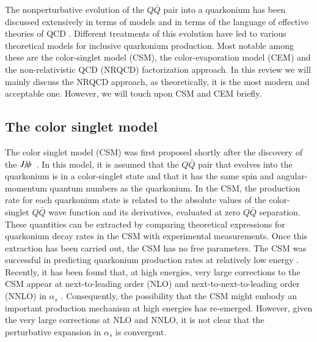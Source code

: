 The nonperturbative evolution of the $Q\bar Q$ pair into a quarkonium
has been discussed extensively in terms of models and in terms of the
language of effective theories of QCD
\cite{Bodwin:1994jh,Brambilla:2004wf}. Different
treatments of this evolution have led to various theoretical models for
inclusive quarkonium production. Most notable among these are the color-singlet
model (CSM), the color-evaporation model (CEM) and the non-relativistic QCD
(NRQCD) factorization approach. In this review we will mainly discuss the NRQCD 
approach, as theoretically, it is the most modern and acceptable one. However,
we will touch upon CSM and CEM briefly. 





\subsection{The color singlet model}


The color singlet model (CSM) was first proposed shortly after the discovery of the 
$J\hspace{-.08em}/\hspace{-.14em}\psi$~\cite{Einhorn:1975ua,Ellis:1976fj,Carlson:1976cd,Berger:1980ni}.
In this model, it is assumed that the $Q\bar Q$ pair that evolves into
the quarkonium is in a color-singlet state and that it has the same spin
and angular-momentum quantum numbers as the quarkonium. In the CSM, the
production rate for each quarkonium state is related to the absolute
values of the color-singlet $Q\bar Q$ wave function and its derivatives,
evaluated at zero $Q\bar Q$ separation. These quantities can be
extracted by comparing theoretical expressions for quarkonium decay
rates in the CSM with experimental measurements. Once this extraction
has been carried out, the CSM has no free parameters. The CSM was
successful in predicting quarkonium production rates at relatively low
energy \cite{Schuler:1994hy}. Recently, it has been found that, at high
energies, very large corrections to the CSM appear at next-to-leading
order (NLO) and next-to-next-to-leading order (NNLO) in $\alpha_s$
\cite{Artoisenet:2007xi,Campbell:2007ws,Artoisenet:2008fc}.
Consequently, the possibility that the CSM might embody an important 
production mechanism at high energies has re-emerged. 
However, given the very large corrections at
NLO and NNLO, it is not clear that the perturbative expansion in
$\alpha_s$ is convergent. 

